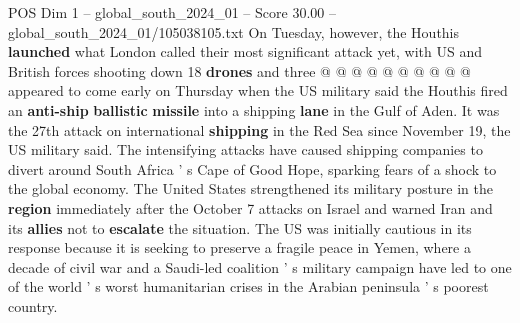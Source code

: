 \begin{textsample}{POS Dim 1 – global\_south\_2024\_01 – Score 30.00 – global\_south\_2024\_01/105038105.txt}
On Tuesday, however, the Houthis \textbf{launched} what London called their most significant attack yet, with US and British forces shooting down 18 \textbf{drones} and three @ @ @ @ @ @ @ @ @ @ appeared to come early on Thursday when the US military said the Houthis fired an \textbf{anti-ship} \textbf{ballistic} \textbf{missile} into a shipping \textbf{lane} in the Gulf of Aden.
It was the 27th attack on international \textbf{shipping} in the Red Sea since November 19, the US military said.
The intensifying attacks have caused shipping companies to divert around South Africa ' s Cape of Good Hope, sparking fears of a shock to the global economy.
The United States strengthened its military posture in the \textbf{region} immediately after the October 7 attacks on Israel and warned Iran and its \textbf{allies} not to \textbf{escalate} the situation.
The US was initially cautious in its response because it is seeking to preserve a fragile peace in Yemen, where a decade of civil war and a Saudi-led coalition ' s military campaign have led to one of the world ' s worst humanitarian crises in the Arabian peninsula ' s poorest country.

\end{textsample}
